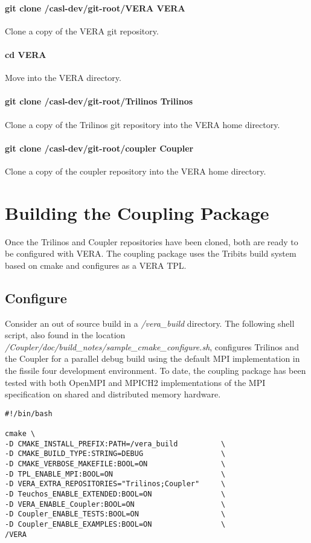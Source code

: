 \documentclass[letterpaper]{article}
\begin{document}
\paragraph{git clone /casl-dev/git-root/VERA VERA}
Clone a copy of the VERA git repository.

\paragraph{cd VERA}
Move into the VERA directory.

\paragraph{git clone /casl-dev/git-root/Trilinos Trilinos}
Clone a copy of the Trilinos git repository into the VERA home
directory. 

\paragraph{git clone /casl-dev/git-root/coupler Coupler} 
Clone a copy of the coupler repository into the VERA home
directory.

\section{Building the Coupling Package}
Once the Trilinos and Coupler repositories have been cloned, both are
ready to be configured with VERA. The coupling package uses the
Tribits build system based on cmake and configures as a VERA TPL.

\subsection{Configure}
Consider an out of source build in a {\sl /vera\_build} directory. The
following shell script, also found in the location
{\sl /Coupler/doc/build\_notes/sample\_cmake\_configure.sh}, configures
Trilinos and the Coupler for a parallel debug build using the default MPI
implementation in the fissile four development environment. To date,
the coupling package has been tested with both OpenMPI and MPICH2
implementations of the MPI specification on shared and distributed
memory hardware.  

\begin{verbatim}
#!/bin/bash

cmake \
-D CMAKE_INSTALL_PREFIX:PATH=/vera_build          \
-D CMAKE_BUILD_TYPE:STRING=DEBUG                  \
-D CMAKE_VERBOSE_MAKEFILE:BOOL=ON                 \
-D TPL_ENABLE_MPI:BOOL=ON                         \
-D VERA_EXTRA_REPOSITORIES="Trilinos;Coupler"     \
-D Teuchos_ENABLE_EXTENDED:BOOL=ON                \
-D VERA_ENABLE_Coupler:BOOL=ON                    \
-D Coupler_ENABLE_TESTS:BOOL=ON                   \
-D Coupler_ENABLE_EXAMPLES:BOOL=ON                \
/VERA
\end{verbatim}
\end{document}
